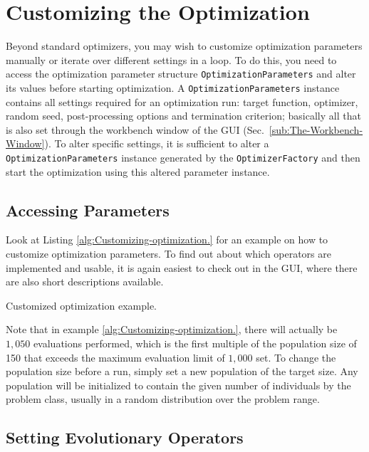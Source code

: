 \section{Customizing the Optimization}

Beyond standard optimizers, you may wish to customize optimization
parameters manually or iterate over different settings in a loop.
To do this, you need to access the optimization parameter structure
\texttt{OptimizationParameters} and alter its values before starting optimization.
A \texttt{OptimizationParameters} instance contains all settings required for
an optimization run: target function, optimizer, random seed, post-processing
options and termination criterion; basically all that is also set
through the workbench window of the GUI (Sec.~\ref{sub:The-Workbench-Window}).
To alter specific settings, it is sufficient to alter a \texttt{OptimizationParameters}
instance generated by the \texttt{OptimizerFactory} and then start
the optimization using this altered parameter instance.


\subsection{Accessing Parameters}

Look at Listing \ref{alg:Customizing-optimization.} for an example
on how to customize optimization parameters. To find out about which
operators are implemented and usable, it is again easiest to check
out in the GUI, where there are also short descriptions available.

\begin{algorithm}


\caption{Customized optimization example.\label{alg:Customizing-optimization.}}
\end{algorithm}


Note that in example \ref{alg:Customizing-optimization.}, there will
actually be $1,050$ evaluations performed, which is the first multiple
of the population size of 150 that exceeds the maximum evaluation
limit of $1,000$ set. To change the population size before a run,
simply set a new population of the target size. Any population will
be initialized to contain the given number of individuals by the problem
class, usually in a random distribution over the problem range.


\subsection{Setting Evolutionary Operators\label{sub:Setting-Evolutionary-Operators}}

